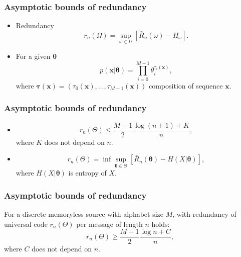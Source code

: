 \documentclass[14pt]{beamer}
\renewcommand{\vec}[1]{\ensuremath{\boldsymbol{#1}}}
\begin{document}
\begin{frame}
\frametitle{Asymptotic bounds of redundancy}
\begin{itemize}    

    \item Redundancy
    \begin{equation}
    \label{redundancy1}
     r_n(\Omega ) = \mathop {\sup }\limits_{ \omega \in \Omega }
    \left[ {\bar {R}_n(\omega)- H_\omega } \right].
    \end{equation}

    \item For a given $\vec \theta$ 
    \[
    p(\vec x | \vec \theta) = \prod_{i=0}^{M-1} \theta_i ^ {\tau _i(\vec x)} ,
    \]
    where $\vec \tau (\vec x) = (\tau_0(\vec x), \dots, \tau_{M-1}(\vec x))$ composition of sequence $\vec x$.

\end{itemize}
\end{frame}



\begin{frame}
\frametitle{Asymptotic bounds of redundancy}
\begin{itemize}    

    \item 
    \begin{equation}
    \label{eq31_0}  r_n(\Theta ) \le  \frac{M - 1}{2}\frac{\log (n + 1)
    + K}{n},
    \end{equation}
    where $K$ does not depend on $n$.
    
    \item 
    \begin{equation}
    \label{redundancy2}
    r_n(\Theta ) = \inf \mathop {\sup }\limits_{\vec \theta \in \Theta } \left[ {\bar {R}_n(\vec \theta)- H(X|\vec \theta) } \right] ,
    \end{equation}
    where $H(X|\vec \theta)$ is entropy of $X$.
    
    
\end{itemize}
\end{frame}



\begin{frame}
\frametitle{Asymptotic bounds of redundancy}
 
    \begin{theorem} \label{low_bound}
    For a discrete memoryless source with alphabet size $M$, 
    with redundancy of universal code $r_n(\Theta) $ per message of length $n$ holds:
    \begin{equation}
    \label{eq31_4} r_n(\Theta) \ge \frac{M - 1}{2}\frac{\log n+C}{n} ,
    \end{equation}
    where $C$ does not depend on $n$.
    \end{theorem}
\end{frame}
\end{document}
